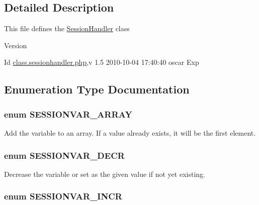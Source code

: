 \subsection{Detailed Description}
This file defines the \hyperlink{classSessionHandler}{SessionHandler} class \begin{DoxyVersion}{Version}

\end{DoxyVersion}
\begin{DoxyParagraph}{Id}
\hyperlink{class_8sessionhandler_8php}{class.sessionhandler.php},v 1.5 2010-\/10-\/04 17:40:40 oscar Exp 
\end{DoxyParagraph}


\subsection{Enumeration Type Documentation}
\subsubsection[{SESSIONVAR\_\-ARRAY}]{\setlength{\rightskip}{0pt plus 5cm}enum {\bf SESSIONVAR\_\-ARRAY}}\label{class_8sessionhandler_8php_a37ebf617beca75ce8d60f06b8c37423a}


Add the variable to an array. If a value already exists, it will be the first element. 

\subsubsection[{SESSIONVAR\_\-DECR}]{\setlength{\rightskip}{0pt plus 5cm}enum {\bf SESSIONVAR\_\-DECR}}\label{class_8sessionhandler_8php_a25d82db99af8d3372efbccb0917f33cb}


Decrease the variable or set as the given value if not yet existing. 

\subsubsection[{SESSIONVAR\_\-INCR}]{\setlength{\rightskip}{0pt plus 5cm}enum {\bf SESSIONVAR\_\-INCR}}\label{class_8sessionhandler_8php_acf42fdbedc1bd30daaebadb12f63c75c}


